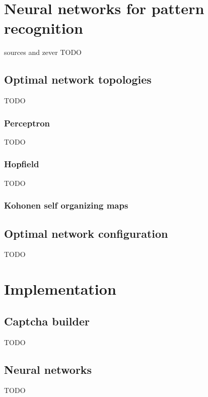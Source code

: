 \documentclass[pdftex,a4paper,12pt,twoside]{report}
\theoremstyle{plain} \newtheorem{theorem}{Theorem} \newtheorem{proposition}{Proposition} \newtheorem{lemma}{Lemma} \newtheorem*{corollary}{Corollary}
\theoremstyle{definition} \newtheorem{definition}{Definition} \newtheorem{conjecture}{Conjecture} \newtheorem*{example}{Example} \newtheorem{algorithm}{Algorithm}
\theoremstyle{remark} \newtheorem*{remark}{Remark} \newtheorem*{note}{Note} \newtheorem{case}{Case}
\begin{document}
\section{Neural networks for pattern recognition}
sources and zever
TODO
\subsection{Optimal network topologies}
TODO
\subsubsection{Perceptron}
TODO
\subsubsection{Hopfield}
TODO
\subsubsection{Kohonen self organizing maps}
\subsection{Optimal network configuration}
TODO
\section{Implementation}
\label{sec:implementation}
\subsection{Captcha builder}
TODO
\subsection{Neural networks}
TODO
\end{document}
